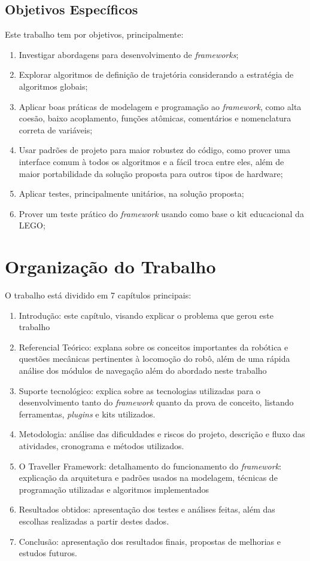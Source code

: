 \subsection{Objetivos Específicos}

Este trabalho tem por objetivos, principalmente:
\begin{enumerate}
	\item Investigar abordagens para desenvolvimento de \textit{frameworks};
	\item Explorar algoritmos de definição de trajetória considerando a estratégia de algoritmos globais;
	\item Aplicar boas práticas de modelagem e programação ao \textit{framework}, como alta coesão, baixo acoplamento, funções atômicas, comentários e nomenclatura correta de variáveis;
	\item Usar padrões de projeto para maior robustez do código, como prover uma interface comum à todos os algoritmos e a fácil troca entre eles, além de maior portabilidade da solução proposta para outros tipos de hardware;
	\item Aplicar testes, principalmente unitários, na solução proposta;
	\item Prover um teste prático do \textit{framework} usando como base o kit educacional da LEGO;
\end{enumerate}

\section{Organização do Trabalho}

O trabalho está dividido em 7 capítulos principais:
\begin{enumerate}
	\item Introdução: este capítulo, visando explicar o problema que gerou este trabalho
	\item Referencial Teórico: explana sobre os conceitos importantes da robótica e questões mecânicas pertinentes à locomoção do robô, além de uma rápida análise dos módulos de navegação além do abordado neste trabalho
	\item Suporte tecnológico: explica sobre as tecnologias utilizadas para o desenvolvimento tanto do \textit{framework} quanto da prova de conceito, listando ferramentas, \textit{plugins} e kits utilizados.	
	\item Metodologia: análise das dificuldades e riscos do projeto, descrição e fluxo das atividades, cronograma e métodos utilizados.
	\item O Traveller Framework: detalhamento do funcionamento do \textit{framework}: explicação da arquitetura e padrões usados na modelagem, técnicas de programação utilizadas e algoritmos implementados
	\item Resultados obtidos: apresentação dos testes e análises feitas, além das escolhas realizadas a partir destes dados.	
	\item Conclusão: apresentação dos resultados finais, propostas de melhorias e estudos futuros.
\end{enumerate}
